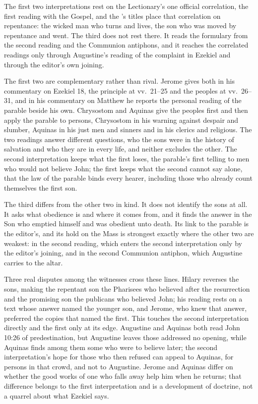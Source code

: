 The first two interpretations rest on the Lectionary's one official
correlation, the first reading with the Gospel, and the 's titles
place that correlation on repentance: the wicked man who turns and lives, the
son who was moved by repentance and went. The third does not rest there. It
reads the formulary from the second reading and the Communion antiphons, and
it reaches the correlated readings only through Augustine's reading of the
complaint in Ezekiel and through the editor's own joining.

The first two are complementary rather than rival. Jerome gives both in his
commentary on Ezekiel 18, the principle at vv.~21--25 and the peoples at
vv.~26--31, and in his commentary on Matthew he reports the personal reading of
the parable beside his own. Chrysostom and Aquinas give the peoples first and
then apply the parable to persons, Chrysostom in his warning against despair
and slumber, Aquinas in his just men and sinners and in his clerics and
religious. The two readings answer different questions, who the sons were in
the history of salvation and who they are in every life, and neither excludes
the other. The second interpretation keeps what the first loses, the parable's
first telling to men who would not believe John; the first keeps what the
second cannot say alone, that the law of the parable binds every hearer,
including those who already count themselves the first son.

The third differs from the other two in kind. It does not identify the sons at
all. It asks what obedience is and where it comes from, and it finds the answer
in the Son who emptied himself and was obedient unto death. Its link to the
parable is the editor's, and its hold on the Mass is strongest exactly where
the other two are weakest: in the second reading, which enters the second
interpretation only by the editor's joining, and in the second Communion
antiphon, which Augustine carries to the altar.

Three real disputes among the witnesses cross these lines. Hilary reverses the
sons, making the repentant son the Pharisees who believed after the
resurrection and the promising son the publicans who believed John; his
reading rests on a text whose answer named the younger son, and Jerome, who
knew that answer, preferred the copies that named the first. This touches the
second interpretation directly and the first only at its edge. Augustine and
Aquinas both read John 10:26 of predestination, but Augustine leaves those
addressed no opening, while Aquinas finds among them some who were to believe
later; the second interpretation's hope for those who then refused can appeal
to Aquinas, for persons in that crowd, and not to Augustine. Jerome and Aquinas differ on whether the good
works of one who falls away help him when he returns; that difference belongs
to the first interpretation and is a development of doctrine, not a quarrel
about what Ezekiel says.


